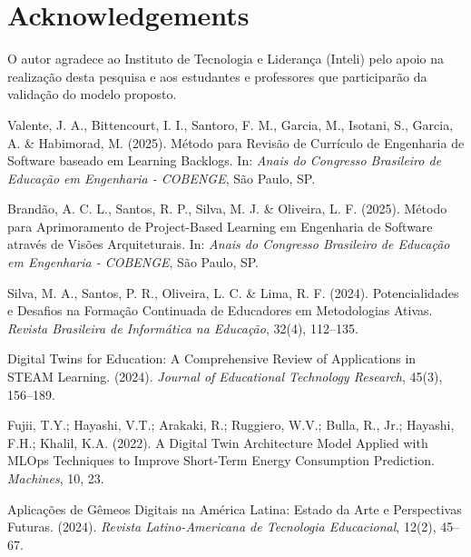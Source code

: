 \documentclass[english, spanish, brazilian]{RBIEarticle} %
\begin{document}
\section*{Acknowledgements}
O autor agradece ao Instituto de Tecnologia e Liderança (Inteli) pelo apoio na realização desta pesquisa e aos estudantes e professores que participarão da validação do modelo proposto.



\begin{thebibliography}{99}

  Valente, J. A., Bittencourt, I. I., Santoro, F. M., Garcia, M., Isotani, S., Garcia, A. \& Habimorad, M. (2025). Método para Revisão de Currículo de Engenharia de Software baseado em Learning Backlogs. In: \textit{Anais do Congresso Brasileiro de Educação em Engenharia - COBENGE}, São Paulo, SP.

  Brandão, A. C. L., Santos, R. P., Silva, M. J. \& Oliveira, L. F. (2025). Método para Aprimoramento de Project-Based Learning em Engenharia de Software através de Visões Arquiteturais. In: \textit{Anais do Congresso Brasileiro de Educação em Engenharia - COBENGE}, São Paulo, SP.

  Silva, M. A., Santos, P. R., Oliveira, L. C. \& Lima, R. F. (2024). Potencialidades e Desafios na Formação Continuada de Educadores em Metodologias Ativas. \textit{Revista Brasileira de Informática na Educação}, 32(4), 112--135.

  Digital Twins for Education: A Comprehensive Review of Applications in STEAM Learning. (2024). \textit{Journal of Educational Technology Research}, 45(3), 156--189.

  Fujii, T.Y.; Hayashi, V.T.; Arakaki, R.; Ruggiero, W.V.; Bulla, R., Jr.; Hayashi, F.H.; Khalil, K.A. (2022). A Digital Twin Architecture Model Applied with MLOps Techniques to Improve Short-Term Energy Consumption Prediction. \textit{Machines}, 10, 23.

  Aplicações de Gêmeos Digitais na América Latina: Estado da Arte e Perspectivas Futuras. (2024). \textit{Revista Latino-Americana de Tecnologia Educacional}, 12(2), 45--67.

\end{thebibliography}

\end{document}
